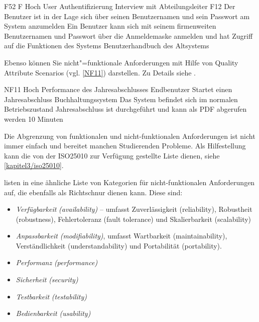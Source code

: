 \snowcard %
   {F52} %
   {F} %
   {Hoch} %
   {User Authentifizierung} %
   {Interview mit Abteilungsleiter} %
   {F12} %
   {Der Benutzer ist in der Lage sich über seinen
    Benutzernamen und sein Passwort am System anzumelden} %
   {Ein Benutzer kann sich mit seinem firmenweiten Benutzernamen und
   Passwort über die Anmeldemaske anmelden und hat Zugriff auf die
   Funktionen des Systems} %
   {Benutzerhandbuch des Altsystems} %

Ebenso können Sie nicht"=funktionale Anforderungen mit Hilfe von Quality Attribute Scenarios (vgl. \autoref{NF11}) darstellen. Zu Details siehe \autocite{Barbacci2003}.

\qas %
   {NF11} %
   {Hoch} %
   {Performance des Jahresabschlusses} %
   {Endbenutzer} %
   {Startet einen Jahresabschluss} %
   {Buchhaltungssystem} %
   {Das System befindet sich im normalen Betriebszustand} %
   {Jahresabschluss ist durchgeführt und kann als PDF abgerufen werden} %
   {10 Minuten} %

Die Abgrenzung von funktionalen und nicht-funktionalen Anforderungen ist nicht immer einfach und bereitet manchen Studierenden Probleme. Als Hilfestellung kann die von der ISO25010 \autocite{ISO25010} zur Verfügung gestellte Liste dienen, siehe \autoref{kapitel3/iso25010}.


\citeauthor{Bass2003} listen in \autocite{Bass2003} eine ähnliche Liste von Kategorien für nicht-funktionalen Anforderungen auf, die ebenfalls als Richtschnur dienen kann. Diese sind:

\begin{itemize}
  \item \textit{Verfügbarkeit} \textit{(availability)} -- umfasst Zuverlässigkeit (reliability), Robustheit (robustness), Fehlertoleranz (fault tolerance) und Skalierbarkeit (scalability)
  \item \textit{Anpassbarkeit} \textit{(modifiability)}, umfasst Wartbarkeit (maintainability), Verständlichkeit (understandability) und Portabilität (portability).
  \item \textit{Performanz} \textit{(performance)}
  \item \textit{Sicherheit} \textit{(security)}
  \item \textit{Testbarkeit} \textit{(testability)}
  \item \textit{Bedienbarkeit} \textit{(usability)}
\end{itemize}
